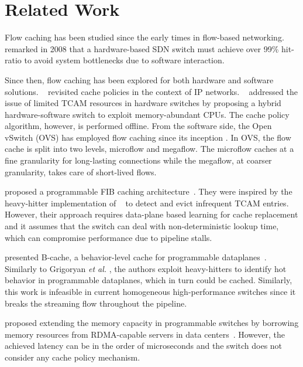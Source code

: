 \section{Related Work}\label{sec:related_works}

Flow caching has been studied since the early times in flow-based networking.
\citeauthor{casado:2008}~\cite{casado:2008} remarked in 2008 that a hardware-based SDN switch must achieve over 99\% hit-ratio to avoid system bottlenecks due to software interaction.

Since then, flow caching has been explored for both hardware and software solutions.
\citeauthor{Kim:09}~\cite{Kim:09} revisited cache policies in the context of IP networks.
\citeauthor{Katta:2014}~\cite{Katta:2014,Katta:2016} addressed the issue of limited TCAM resources in hardware switches by proposing a hybrid hardware-software switch to exploit memory-abundant CPUs.
The cache policy algorithm, however, is performed offline. 
From the software side, the Open vSwitch (OVS) has employed flow caching since its inception \cite{Pfaff:15}.
In OVS, the flow cache is split into two levels, microflow and megaflow.
The microflow caches at a fine granularity for long-lasting connections while the megaflow, at coarser granularity, takes care of short-lived flows.

\citeauthor{Grigoryan:18} proposed a programmable FIB caching architecture~\cite{Grigoryan:18}.
They were inspired by the heavy-hitter implementation of \citeauthor{Sivaraman:17}~\cite{Sivaraman:17} to detect and evict infrequent TCAM entries.
However, their approach requires data-plane based learning for cache replacement and it assumes that the switch can deal with non-deterministic lookup time, which can compromise performance due to pipeline stalls. 

\citeauthor{Zhang:2018} presented B-cache, a behavior-level cache for programmable dataplanes~\cite{Zhang:2018}. Similarly to Grigoryan \textit{et al.} \cite{Grigoryan:18}, the authors exploit heavy-hitters to identify hot behavior in programmable dataplanes, which in turn could be cached. Similarly, this work is infeasible in current homogeneous high-performance switches since it breaks the streaming flow throughout the pipeline.

\citeauthor{Kim:2018} proposed extending the memory capacity in programmable switches by borrowing memory resources from RDMA-capable servers in data centers~\cite{Kim:2018}. However, the achieved latency can be in the order of microseconds and the switch does not consider any cache policy mechanism.

